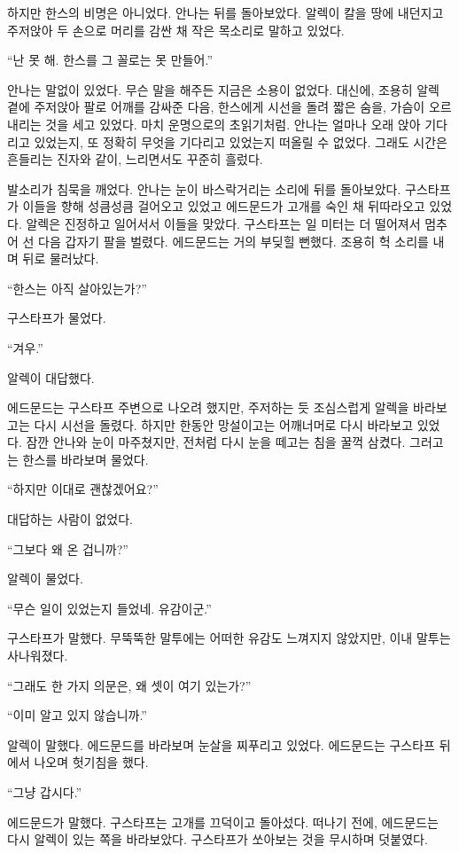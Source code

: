 하지만 한스의 비명은 아니었다. 안나는 뒤를 돌아보았다. 알렉이 칼을 땅에 내던지고 주저앉아 두 손으로 머리를 감싼 채 작은 목소리로 말하고 있었다.

``난 못 해. 한스를 그 꼴로는 못 만들어.''

안나는 말없이 있었다. 무슨 말을 해주든 지금은 소용이 없었다. 대신에, 조용히 알렉 곁에 주저앉아 팔로 어깨를 감싸준 다음, 한스에게 시선을 돌려 짧은 숨을, 가슴이 오르내리는 것을 세고 있었다. 마치 운명으로의 초읽기처럼. 안나는 얼마나 오래 앉아 기다리고 있었는지, 또 정확히 무엇을 기다리고 있었는지 떠올릴 수 없었다. 그래도 시간은 흔들리는 진자와 같이, 느리면서도 꾸준히 흘렀다.

발소리가 침묵을 깨었다. 안나는 눈이 바스락거리는 소리에 뒤를 돌아보았다. 구스타프가 이들을 향해 성큼성큼 걸어오고 있었고 에드문드가 고개를 숙인 채 뒤따라오고 있었다. 알렉은 진정하고 일어서서 이들을 맞았다. 구스타프는 일 미터는 더 떨어져서 멈추어 선 다음 갑자기 팔을 벌렸다. 에드문드는 거의 부딪힐 뻔했다. 조용히 헉 소리를 내며 뒤로 물러났다.

``한스는 아직 살아있는가?''

구스타프가 물었다.

``겨우.''

알렉이 대답했다.

에드문드는 구스타프 주변으로 나오려 했지만, 주저하는 듯 조심스럽게 알렉을 바라보고는 다시 시선을 돌렸다. 하지만 한동안 망설이고는 어깨너머로 다시 바라보고 있었다. 잠깐 안나와 눈이 마주쳤지만, 전처럼 다시 눈을 떼고는 침을 꿀꺽 삼켰다. 그러고는 한스를 바라보며 물었다.

``하지만 이대로 괜찮겠어요?''

대답하는 사람이 없었다.

``그보다 왜 온 겁니까?''

알렉이 물었다.

``무슨 일이 있었는지 들었네. 유감이군.''

구스타프가 말했다. 무뚝뚝한 말투에는 어떠한 유감도 느껴지지 않았지만, 이내 말투는 사나워졌다.

``그래도 한 가지 의문은, 왜 셋이 여기 있는가?''

``이미 알고 있지 않습니까.''

알렉이 말했다. 에드문드를 바라보며 눈살을 찌푸리고 있었다. 에드문드는 구스타프 뒤에서 나오며 헛기침을 했다.

``그냥 갑시다.''

에드문드가 말했다. 구스타프는 고개를 끄덕이고 돌아섰다. 떠나기 전에, 에드문드는 다시 알렉이 있는 쪽을 바라보았다. 구스타프가 쏘아보는 것을 무시하며 덧붙였다.

